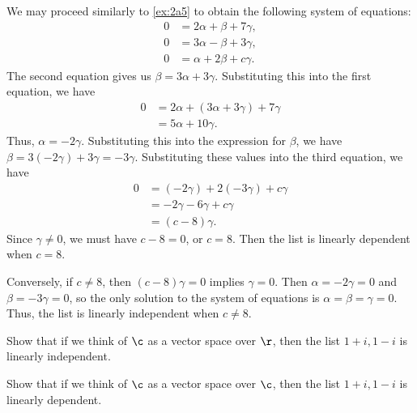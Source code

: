 \begin{sol}
    We may proceed similarly to \autoref{ex:2a5} to obtain the following system of equations:
    \begin{align*}
        0 & = 2\alpha + \beta + 7\gamma, \\
        0 & = 3\alpha - \beta + 3\gamma, \\
        0 & = \alpha + 2\beta + c\gamma.
    \end{align*}
    The second equation gives us $\beta = 3\alpha + 3\gamma$. Substituting this into the first equation, we have
    \begin{align*}
        0 & = 2\alpha + (3\alpha + 3\gamma) + 7\gamma \\
        & = 5\alpha + 10\gamma.
    \end{align*}
    Thus, $\alpha = -2\gamma$. Substituting this into the expression for $\beta$, we have $\beta = 3(-2\gamma) + 3\gamma = -3\gamma$. Substituting these values into the third equation, we have
    \begin{align*}
        0 & = (-2\gamma) + 2(-3\gamma) + c\gamma \\
        & = -2\gamma - 6\gamma + c\gamma \\
        & = (c - 8)\gamma.
    \end{align*}
    Since $\gamma \neq 0$, we must have $c - 8 = 0$, or $c = 8$. Then the list is linearly dependent when $c = 8$.

    Conversely, if $c \neq 8$, then $(c - 8)\gamma = 0$ implies $\gamma = 0$. Then $\alpha = -2\gamma = 0$ and $\beta = -3\gamma = 0$, so the only solution to the system of equations is $\alpha = \beta = \gamma = 0$. Thus, the list is linearly independent when $c \neq 8$.
\end{sol}
 
\begin{exercise}[2a7]
    \begin{subexercises}
        \item Show that if we think of $\c$ as a vector space over $\r$, then the list $1 + i, 1 - i$ is linearly independent.
        \item Show that if we think of $\c$ as a vector space over $\c$, then the list $1 + i, 1 - i$ is linearly dependent.
    \end{subexercises}
\end{exercise}

